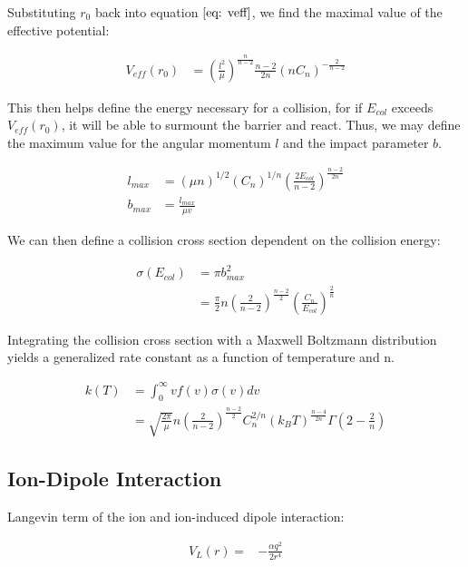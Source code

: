 Substituting $r_0$ back into equation $\ref{eq: veff}$, we find the maximal value of the effective potential:

\begin{align}
    V_{eff}(r_0) & = \left(\frac{l^2}{\mu}\right)^{\frac{n}{n-2}} \frac{n-2}{2n}(n C_n)^{-\frac{2}{n-2}}
\end{align}

This then helps define the energy necessary for a collision, for if $E_{col}$ exceeds $V_{eff}(r_0)$, it will be able to surmount the barrier and react. Thus, we may define the maximum value for the angular momentum $l$ and the impact parameter $b$.

\begin{align*}
    l_{max} & = (\mu n)^{1/2}(C_n)^{1/n} \left(\frac{2 E_{col}}{n-2}\right)^{\frac{n-2}{2n}} \\
    b_{max} & = \frac{l_{max}}{\mu v}
\end{align*}

We can then define a collision cross section dependent on the collision energy:

\begin{align*}
    \sigma(E_{col}) & = \pi b^2_{max} \\
    & = \frac{\pi}{2} n \left(\frac{2}{n-2}\right)^{\frac{n-2}{2}} \left(\frac{C_n}{E_{col}}\right)^{\frac{2}{n}}
\end{align*}

Integrating the collision cross section with a Maxwell Boltzmann distribution yields a generalized rate constant as a function of temperature and n.

\begin{align}
    k(T) & = \int_0^{\infty} v f(v) \sigma(v) dv \label{eq: k int} \\
    & = \boxed{\sqrt{\frac{2 \pi}{\mu}}n\left(\frac{2}{n-2}\right)^{\frac{n-2}{2}}C_n^{2/n}(k_B T)^{\frac{n-4}{2n}}\Gamma\left(2-\frac{2}{n}\right)} \nonumber
\end{align}

\subsection{Ion-Dipole Interaction}

Langevin term of the ion and ion-induced dipole interaction:

\begin{align}
V_L(r)= &-\frac{\alpha q^2}{2r^4}
\end{align}

